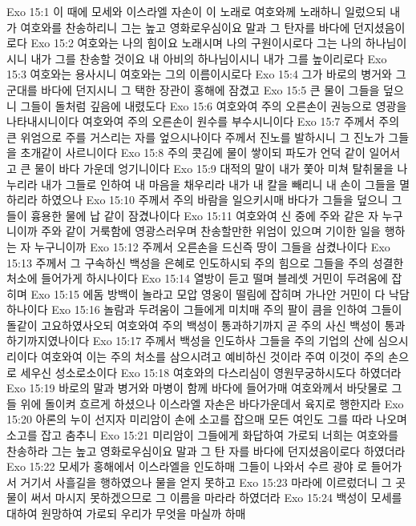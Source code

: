 Exo 15:1  이 때에 모세와 이스라엘 자손이 이 노래로 여호와께 노래하니 일렀으되 내가 여호와를 찬송하리니 그는 높고 영화로우심이요 말과 그 탄자를 바다에 던지셨음이로다
Exo 15:2  여호와는 나의 힘이요 노래시며 나의 구원이시로다 그는 나의 하나님이시니 내가 그를 찬송할 것이요 내 아비의 하나님이시니 내가 그를 높이리로다
Exo 15:3  여호와는 용사시니 여호와는 그의 이름이시로다
Exo 15:4  그가 바로의 병거와 그 군대를 바다에 던지시니 그 택한 장관이 홍해에 잠겼고
Exo 15:5  큰 물이 그들을 덮으니 그들이 돌처럼 깊음에 내렸도다
Exo 15:6  여호와여 주의 오른손이 권능으로 영광을 나타내시니이다 여호와여 주의 오른손이 원수를 부수시니이다
Exo 15:7  주께서 주의 큰 위엄으로 주를 거스리는 자를 엎으시나이다 주께서 진노를 발하시니 그 진노가 그들을 초개같이 사르니이다
Exo 15:8  주의 콧김에 물이 쌓이되 파도가 언덕 같이 일어서고 큰 물이 바다 가운데 엉기니이다
Exo 15:9  대적의 말이 내가 쫓아 미쳐 탈취물을 나누리라 내가 그들로 인하여 내 마음을 채우리라 내가 내 칼을 빼리니 내 손이 그들을 멸하리라 하였으나
Exo 15:10  주께서 주의 바람을 일으키시매 바다가 그들을 덮으니 그들이 흉용한 물에 납 같이 잠겼나이다
Exo 15:11  여호와여 신 중에 주와 같은 자 누구니이까 주와 같이 거룩함에 영광스러우며 찬송할만한 위엄이 있으며 기이한 일을 행하는 자 누구니이까
Exo 15:12  주께서 오른손을 드신즉 땅이 그들을 삼켰나이다
Exo 15:13  주께서 그 구속하신 백성을 은혜로 인도하시되 주의 힘으로 그들을 주의 성결한 처소에 들어가게 하시나이다
Exo 15:14  열방이 듣고 떨며 블레셋 거민이 두려움에 잡히며
Exo 15:15  에돔 방백이 놀라고 모압 영웅이 떨림에 잡히며 가나안 거민이 다 낙담하나이다
Exo 15:16  놀람과 두려움이 그들에게 미치매 주의 팔이 큼을 인하여 그들이 돌같이 고요하였사오되 여호와여 주의 백성이 통과하기까지 곧 주의 사신 백성이 통과하기까지였나이다
Exo 15:17  주께서 백성을 인도하사 그들을 주의 기업의 산에 심으시리이다 여호와여 이는 주의 처소를 삼으시려고 예비하신 것이라 주여 이것이 주의 손으로 세우신 성소로소이다
Exo 15:18  여호와의 다스리심이 영원무궁하시도다 하였더라
Exo 15:19  바로의 말과 병거와 마병이 함께 바다에 들어가매 여호와께서 바닷물로 그들 위에 돌이켜 흐르게 하셨으나 이스라엘 자손은 바다가운데서 육지로 행한지라
Exo 15:20  아론의 누이 선지자 미리암이 손에 소고를 잡으매 모든 여인도 그를 따라 나오며 소고를 잡고 춤추니
Exo 15:21  미리암이 그들에게 화답하여 가로되 너희는 여호와를 찬송하라 그는 높고 영화로우심이요 말과 그 탄 자를 바다에 던지셨음이로다 하였더라
Exo 15:22  모세가 홍해에서 이스라엘을 인도하매 그들이 나와서 수르 광야 로 들어가서 거기서 사흘길을 행하였으나 물을 얻지 못하고
Exo 15:23  마라에 이르렀더니 그 곳 물이 써서 마시지 못하겠으므로 그 이름을 마라라 하였더라
Exo 15:24  백성이 모세를 대하여 원망하여 가로되 우리가 무엇을 마실까 하매
